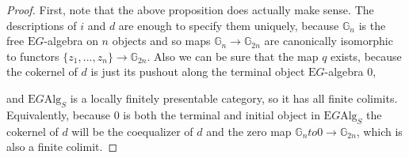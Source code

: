 \documentclass{amsart} %
\newenvironment{eq*}{\begin{equation*}}{\end{equation*}}
\begin{document}
\begin{proof}
First, note that the above proposition does actually make sense. The descriptions of $i$ and $d$ are enough to specify them uniquely, because $\mathbb{G}_n$ is the free $\mathrm{E}G$-algebra on $n$ objects and so maps $\mathbb{G}_n \to \mathbb{G}_{2n}$ are canonically isomorphic to functors $\{z_1, ..., z_n\} \to \mathbb{G}_{2n}$. Also we can be sure that the map $q$ exists, because the cokernel of $d$ is just its pushout along the terminal object $\mathrm{E}G$-algebra $0$,
\begin{eq*}  \end{eq*}
and $\mathrm{E}G\mathrm{Alg}_S$ is a locally finitely presentable category, so it has all finite colimits. Equivalently, because $0$ is both the terminal and initial object in $\mathrm{E}G\mathrm{Alg}_S$ the cokernel of $d$ will be the coequalizer of $d$ and the zero map $\mathbb{G}_n to 0 \to \mathbb{G}_{2n}$, which is also a finite colimit. 


\end{proof}
\end{document}
